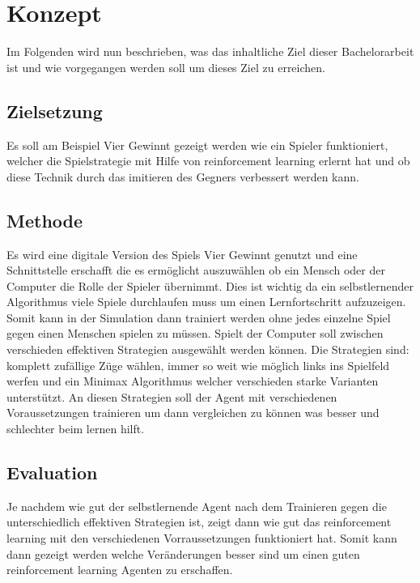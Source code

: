 \chapter{Konzept}%

\label{cha:Konzept}

Im Folgenden wird nun beschrieben, was das inhaltliche Ziel dieser Bachelorarbeit ist und wie vorgegangen werden soll um dieses Ziel zu erreichen.

\section{Zielsetzung}
Es soll am Beispiel Vier Gewinnt gezeigt werden wie ein Spieler funktioniert, welcher die Spielstrategie mit Hilfe von reinforcement learning erlernt hat und ob diese Technik durch das imitieren des Gegners verbessert werden kann.

\section{Methode}
%
Es wird eine digitale Version des Spiels Vier Gewinnt genutzt und eine Schnittstelle erschafft die es ermöglicht auszuwählen ob ein Mensch oder der Computer die Rolle der Spieler übernimmt. Dies ist wichtig da ein selbstlernender Algorithmus viele Spiele durchlaufen muss um einen Lernfortschritt aufzuzeigen. Somit kann in der Simulation dann trainiert werden ohne jedes einzelne Spiel gegen einen Menschen spielen zu müssen. Spielt der Computer soll zwischen verschieden effektiven Strategien ausgewählt werden können. Die Strategien sind: komplett zufällige Züge wählen, immer so weit wie möglich links ins Spielfeld werfen und ein Minimax Algorithmus welcher verschieden starke Varianten unterstützt.
An diesen Strategien soll der Agent mit verschiedenen Voraussetzungen trainieren um dann vergleichen zu können was besser und schlechter beim lernen hilft.
%



\section{Evaluation}
Je nachdem wie gut der selbstlernende Agent nach dem Trainieren gegen die unterschiedlich effektiven Strategien ist, zeigt dann wie gut das reinforcement learning mit den verschiedenen Vorraussetzungen funktioniert hat. Somit kann dann gezeigt werden welche Veränderungen besser sind um einen guten reinforcement learning Agenten zu erschaffen.

